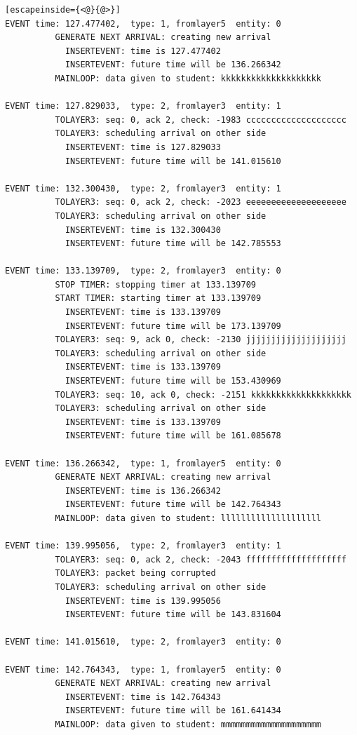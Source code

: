 \documentclass[paper=a4, fontsize=11pt]{scrartcl}
\numberwithin{equation}{section}		%
\numberwithin{figure}{section}			%
\numberwithin{table}{section}				%
\begin{document}
\begin{lstlisting}[escapeinside={<@}{@>}]
EVENT time: 127.477402,  type: 1, fromlayer5  entity: 0
          GENERATE NEXT ARRIVAL: creating new arrival
            INSERTEVENT: time is 127.477402
            INSERTEVENT: future time will be 136.266342
          MAINLOOP: data given to student: kkkkkkkkkkkkkkkkkkkk

EVENT time: 127.829033,  type: 2, fromlayer3  entity: 1
          TOLAYER3: seq: 0, ack 2, check: -1983 cccccccccccccccccccc
          TOLAYER3: scheduling arrival on other side
            INSERTEVENT: time is 127.829033
            INSERTEVENT: future time will be 141.015610

EVENT time: 132.300430,  type: 2, fromlayer3  entity: 1
          TOLAYER3: seq: 0, ack 2, check: -2023 eeeeeeeeeeeeeeeeeeee
          TOLAYER3: scheduling arrival on other side
            INSERTEVENT: time is 132.300430
            INSERTEVENT: future time will be 142.785553

EVENT time: 133.139709,  type: 2, fromlayer3  entity: 0
          STOP TIMER: stopping timer at 133.139709
          START TIMER: starting timer at 133.139709
            INSERTEVENT: time is 133.139709
            INSERTEVENT: future time will be 173.139709
          TOLAYER3: seq: 9, ack 0, check: -2130 jjjjjjjjjjjjjjjjjjjj
          TOLAYER3: scheduling arrival on other side
            INSERTEVENT: time is 133.139709
            INSERTEVENT: future time will be 153.430969
          TOLAYER3: seq: 10, ack 0, check: -2151 kkkkkkkkkkkkkkkkkkkk
          TOLAYER3: scheduling arrival on other side
            INSERTEVENT: time is 133.139709
            INSERTEVENT: future time will be 161.085678

EVENT time: 136.266342,  type: 1, fromlayer5  entity: 0
          GENERATE NEXT ARRIVAL: creating new arrival
            INSERTEVENT: time is 136.266342
            INSERTEVENT: future time will be 142.764343
          MAINLOOP: data given to student: llllllllllllllllllll

EVENT time: 139.995056,  type: 2, fromlayer3  entity: 1
          TOLAYER3: seq: 0, ack 2, check: -2043 ffffffffffffffffffff
          TOLAYER3: packet being corrupted
          TOLAYER3: scheduling arrival on other side
            INSERTEVENT: time is 139.995056
            INSERTEVENT: future time will be 143.831604

EVENT time: 141.015610,  type: 2, fromlayer3  entity: 0

EVENT time: 142.764343,  type: 1, fromlayer5  entity: 0
          GENERATE NEXT ARRIVAL: creating new arrival
            INSERTEVENT: time is 142.764343
            INSERTEVENT: future time will be 161.641434
          MAINLOOP: data given to student: mmmmmmmmmmmmmmmmmmmm


\end{lstlisting}
\end{document}
